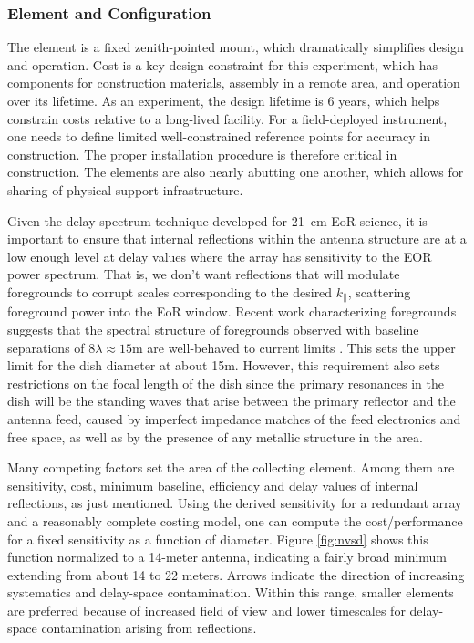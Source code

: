 \documentclass[preprint]{aastex}
\def\kpar{k_{\|}}
\def\kpar{k_{\|}}
\begin{document}
\vspace{-0.25in}
\subsubsection{Element and Configuration}
\vspace{-6pt}


The element is a fixed zenith-pointed mount, which dramatically simplifies design and
operation. Cost is a key design constraint for this experiment, which has components
for construction materials, assembly in a remote area, and operation over its
lifetime. As an experiment, the design lifetime is 6 years, which helps constrain
costs relative to a long-lived facility. For a field-deployed instrument, one needs
to define limited well-constrained reference points for accuracy in construction. The
proper installation procedure is therefore critical in construction. The elements are
also nearly abutting one another, which allows for sharing of physical support
infrastructure.

Given the delay-spectrum technique developed for 21~cm EoR science, it is important
to ensure that internal reflections within the antenna structure are at a low enough
level at delay values where the array has sensitivity to the EOR power spectrum. That
is, we don't want reflections that will modulate foregrounds to corrupt scales
corresponding to the desired $\kpar$, scattering foreground power into the EoR
window. Recent work characterizing foregrounds suggests that the spectral structure
of foregrounds observed with baseline separations of $8\lambda \approx 15$m are
well-behaved to current limits \citep{parsons_et_al2013}. This sets the upper limit
for the dish diameter at about 15m. However, this requirement also sets restrictions
on the focal length of the dish since the primary resonances in the dish will be the
standing waves that arise between the primary reflector and the antenna feed, caused
by imperfect impedance matches of the feed electronics and free space, as well as by
the presence of any metallic structure in the area.

Many competing factors set the area of the collecting element. Among them are
sensitivity, cost, minimum baseline, efficiency and delay values of internal
reflections, as just mentioned. Using the derived sensitivity for a redundant array
\citep{parsons_et_al2012a} and a reasonably complete costing model, one can compute
the cost/performance for a fixed sensitivity as a function of diameter. Figure
\ref{fig:nvsd} shows this function normalized to a 14-meter antenna, indicating a
fairly broad minimum extending from about 14 to 22 meters. Arrows indicate the
direction of increasing systematics and delay-space contamination. Within this range,
smaller elements are preferred because of increased field of view and lower
timescales for delay-space contamination arising from reflections.
\end{document}

